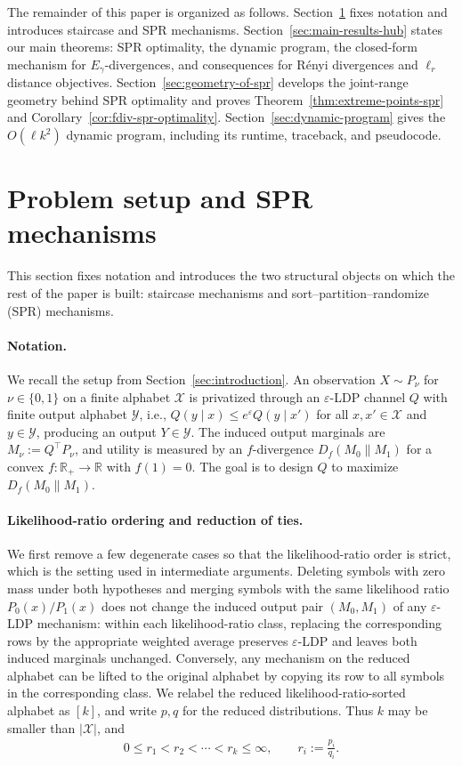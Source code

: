\documentclass{article}
\theoremstyle{plain}
\theoremstyle{definition}
\theoremstyle{plain}
\newcommand{\eps}{\varepsilon}
\newcommand{\X}{\mathcal{X}}
\newcommand{\Y}{\mathcal{Y}}
\begin{document}
The remainder of this paper is organized as follows.
Section~\ref{sec:setup-and-spr} fixes notation and introduces staircase and SPR mechanisms.
Section~\ref{sec:main-results-hub} states our main theorems: SPR optimality, the dynamic program, the closed-form mechanism for $E_\gamma$-divergences, and consequences for R\'enyi divergences and $\ell_r$ distance objectives.
Section~\ref{sec:geometry-of-spr} develops the joint-range geometry behind SPR optimality and proves Theorem~\ref{thm:extreme-points-spr} and Corollary~\ref{cor:fdiv-spr-optimality}.
Section~\ref{sec:dynamic-program} gives the $O(\ell k^2)$ dynamic program, including its runtime, traceback, and pseudocode.

\section{Problem setup and SPR mechanisms}
\label{sec:setup-and-spr}

This section fixes notation and introduces the two structural objects on which the rest of the paper is built: staircase mechanisms and sort--partition--randomize (SPR) mechanisms.

\paragraph{Notation.}
We recall the setup from Section~\ref{sec:introduction}. An observation $X\sim P_\nu$ for $\nu\in\{0,1\}$ on a finite alphabet $\X$ is privatized through an $\eps$-LDP channel $Q$ with finite output alphabet $\Y$, i.e., $Q(y\mid x)\le e^\eps Q(y\mid x')$ for all $x,x'\in\X$ and $y\in\Y$, producing an output $Y\in\Y$. The induced output marginals are $M_\nu := Q^\top P_\nu$, and utility is measured by an $f$-divergence $D_f(M_0\|M_1)$ for a convex $f:\mathbb R_+\to\mathbb R$ with $f(1)=0$. The goal is to design $Q$ to maximize $D_f(M_0\|M_1)$.

\paragraph{Likelihood-ratio ordering and reduction of ties.}
We first remove a few degenerate cases so that the likelihood-ratio order is strict, which is the setting used in intermediate arguments.
Deleting symbols with zero mass under both hypotheses and merging symbols with the same likelihood ratio $P_0(x)/P_1(x)$ does not change the induced output pair $(M_0,M_1)$ of any $\eps$-LDP mechanism: within each likelihood-ratio class, replacing the corresponding rows by the appropriate weighted average preserves $\eps$-LDP and leaves both induced marginals unchanged. Conversely, any mechanism on the reduced alphabet can be lifted to the original alphabet by copying its row to all symbols in the corresponding class. We relabel the reduced likelihood-ratio-sorted alphabet as $[k]$, and write $p,q$ for the reduced distributions. Thus $k$ may be smaller than $|\X|$, and
\begin{align}
    0 \le r_1 < r_2 < \cdots < r_k \le \infty,
    \qquad
    r_i := \frac{p_i}{q_i}.
\end{align}
\end{document}
